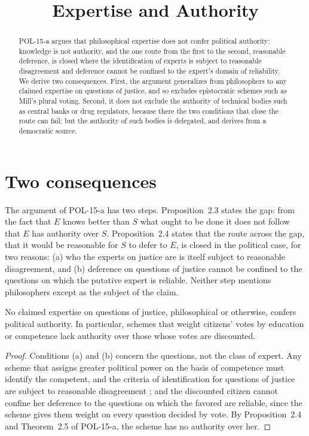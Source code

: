 \documentclass{situationist-preprint}
\title{Expertise and Authority}
\begin{document}
\maketitle

\begin{abstract}
POL-15-a argues that philosophical expertise does not confer political authority: knowledge is not authority, and the one route from the first to the second, reasonable deference, is closed where the identification of experts is subject to reasonable disagreement and deference cannot be confined to the expert's domain of reliability. We derive two consequences. First, the argument generalizes from philosophers to any claimed expertise on questions of justice, and so excludes epistocratic schemes such as Mill's plural voting. Second, it does not exclude the authority of technical bodies such as central banks or drug regulators, because there the two conditions that close the route can fail; but the authority of such bodies is delegated, and derives from a democratic source.
\end{abstract}

\section{Two consequences}

The argument of POL-15-a has two steps. Proposition~2.3 states the gap: from the fact that $E$ knows better than $S$ what ought to be done it does not follow that $E$ has authority over $S$. Proposition~2.4 states that the route across the gap, that it would be reasonable for $S$ to defer to $E$, is closed in the political case, for two reasons: (a) who the experts on justice are is itself subject to reasonable disagreement, and (b) deference on questions of justice cannot be confined to the questions on which the putative expert is reliable. Neither step mentions philosophers except as the subject of the claim.

\begin{proposition}\label{p:epistocracy}
No claimed expertise on questions of justice, philosophical or otherwise, confers political authority. In particular, schemes that weight citizens' votes by education or competence lack authority over those whose votes are discounted.
\end{proposition}

\begin{proof}
Conditions (a) and (b) concern the questions, not the class of expert. Any scheme that assigns greater political power on the basis of competence must identify the competent, and the criteria of identification for questions of justice are subject to reasonable disagreement \citep{Estlund2008}; and the discounted citizen cannot confine her deference to the questions on which the favored are reliable, since the scheme gives them weight on every question decided by vote. By Proposition~2.4 and Theorem~2.5 of POL-15-a, the scheme has no authority over her.
\end{proof}
\end{document}
